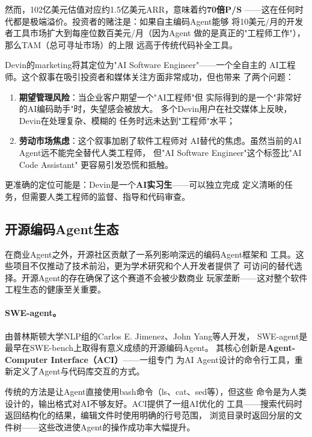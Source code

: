 然而，102亿美元估值对应约1.5亿美元ARR，意味着约\textbf{70倍P/S}
——这在任何时代都是极端溢价。投资者的赌注是：如果自主编码Agent能够
将10美元/月的开发者工具市场扩大到每座位数百美元/月（因为Agent
做的是真正的"工程师工作"），那么TAM（总可寻址市场）的上限
远高于传统代码补全工具。

\begin{warnbox}
Devin的marketing将其定位为"AI Software Engineer"——一个全自主的
AI工程师。这个叙事在吸引投资者和媒体关注方面非常成功，但也带来
了两个问题：
\begin{enumerate}
  \item \textbf{期望管理风险}：当企业客户期望一个"AI工程师"但
    实际得到的是一个"非常好的AI编码助手"时，失望感会被放大。
    多个Devin用户在社交媒体上反映，Devin在处理复杂、模糊的
    任务时远未达到"工程师"水平；
  \item \textbf{劳动市场焦虑}：这个叙事加剧了软件工程师对
    AI替代的焦虑。虽然当前的AI Agent远不能完全替代人类工程师，
    但"AI Software Engineer"这个标签比"AI Code Assistant"
    更容易引发恐慌和抵触。
\end{enumerate}
更准确的定位可能是：Devin是一个\textbf{AI实习生}——可以独立完成
定义清晰的任务，但需要人类工程师的监督、指导和代码审查。
\end{warnbox}

\subsection{开源编码Agent生态}
\label{subsec:oss-agents}

在商业Agent之外，开源社区贡献了一系列影响深远的编码Agent框架和
工具。这些项目不仅推动了技术前沿，更为学术研究和个人开发者提供了
可访问的替代选择。开源Agent的存在确保了这个赛道不会被少数商业
玩家垄断——这对整个软件工程生态的健康至关重要。

\paragraph{SWE-agent。}
由普林斯顿大学NLP组的Carlos E. Jimenez、John Yang等人开发，
SWE-agent是最早在SWE-bench上取得有意义成绩的开源编码Agent。
其核心创新是\textbf{Agent-Computer Interface（ACI）}——一组专门
为AI Agent设计的命令行工具，重新定义了Agent与代码库交互的方式。

传统的方法是让Agent直接使用bash命令（ls、cat、sed等），但这些
命令是为人类设计的，输出格式对AI不够友好。ACI提供了一组AI优化的
工具——搜索代码时返回结构化的结果，编辑文件时使用明确的行号范围，
浏览目录时返回分层的文件树——这些改进使Agent的操作成功率大幅提升。

